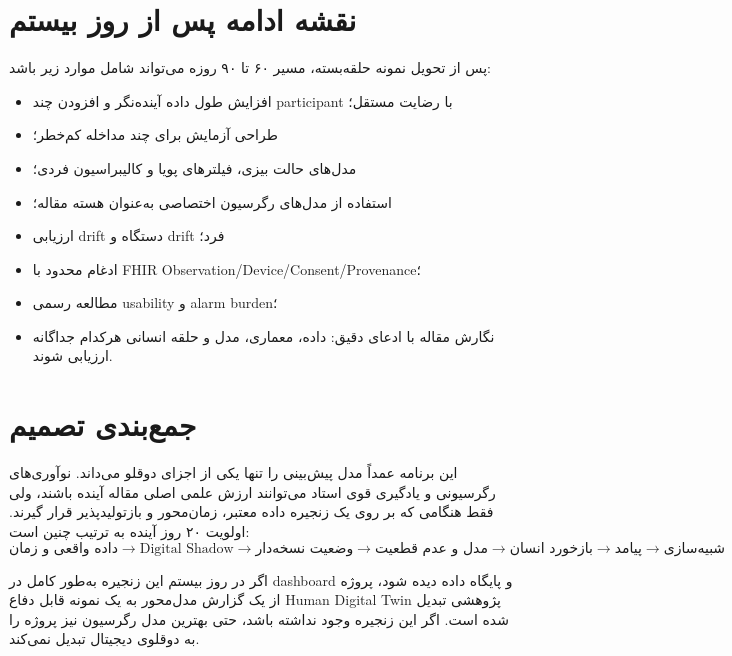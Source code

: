 \documentclass[11pt,a4paper]{article}
\newcommand{\en}[1]{\lr{#1}}
\begin{document}
\section{نقشه ادامه پس از روز بیستم}
پس از تحویل نمونه حلقه‌بسته، مسیر ۶۰ تا ۹۰ روزه می‌تواند شامل موارد زیر باشد:
\begin{itemize}
  \item افزایش طول داده آینده‌نگر و افزودن چند participant با رضایت مستقل؛
  \item طراحی آزمایش \en{N-of-1} برای چند مداخله کم‌خطر؛
  \item مدل‌های حالت بیزی، فیلترهای پویا و کالیبراسیون فردی؛
  \item استفاده از مدل‌های رگرسیون اختصاصی به‌عنوان هسته مقاله؛
  \item ارزیابی drift دستگاه و drift فرد؛
  \item ادغام محدود با FHIR Observation/Device/Consent/Provenance؛
  \item مطالعه رسمی usability و alarm burden؛
  \item نگارش مقاله با ادعای دقیق: داده، معماری، مدل و حلقه انسانی هرکدام جداگانه ارزیابی شوند.
\end{itemize}

\section{جمع‌بندی تصمیم}

این برنامه عمداً مدل پیش‌بینی را تنها یکی از اجزای دوقلو می‌داند. نوآوری‌های رگرسیونی و یادگیری قوی استاد می‌توانند ارزش علمی اصلی مقاله آینده باشند، ولی فقط هنگامی که بر روی یک زنجیره داده معتبر، زمان‌محور و بازتولیدپذیر قرار گیرند. اولویت ۲۰ روز آینده به ترتیب چنین است:
\[
\boxed{
\text{داده واقعی و زمان}
\rightarrow
\text{Digital Shadow}
\rightarrow
\text{وضعیت نسخه‌دار}
\rightarrow
\text{مدل و عدم قطعیت}
\rightarrow
\text{بازخورد انسان}
\rightarrow
\text{پیامد}
\rightarrow
\text{شبیه‌سازی}
}
\]

اگر در روز بیستم این زنجیره به‌طور کامل در dashboard و پایگاه داده دیده شود، پروژه از یک گزارش مدل‌محور به یک نمونه قابل دفاع Human Digital Twin پژوهشی تبدیل شده است. اگر این زنجیره وجود نداشته باشد، حتی بهترین مدل رگرسیون نیز پروژه را به دوقلوی دیجیتال تبدیل نمی‌کند.
\end{document}
